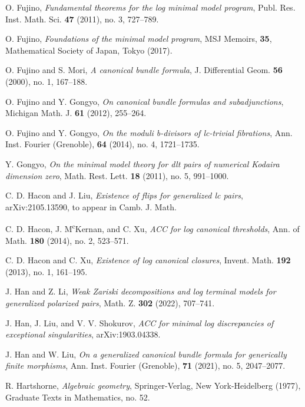 \documentclass[11pt]{amsart}
\numberwithin{equation}{section}
\theoremstyle{definition}
\theoremstyle{definition}
\theoremstyle{definition}
\begin{document}
\begin{thebibliography}{99}
 O. Fujino, \textit{Fundamental theorems for the log minimal model program}, Publ. Res. Inst. Math. Sci. \textbf{47} (2011), no. 3, 727--789.


 O. Fujino, \textit{Foundations of the minimal model program}, MSJ Memoirs, \textbf{35}, Mathematical Society of Japan, Tokyo (2017).

 O. Fujino and S. Mori, \textit{A canonical bundle formula}, J. Differential Geom. \textbf{56} (2000), no. 1, 167--188.

 O. Fujino and Y. Gongyo, \textit{On canonical bundle formulas and subadjunctions}, Michigan Math. J. \textbf{61} (2012), 255--264.

 O. Fujino and Y. Gongyo, \textit{On the moduli b-divisors of lc-trivial fibrations}, Ann. Inst. Fourier (Grenoble), \textbf{64} (2014), no. 4, 1721--1735.

 Y. Gongyo, \textit{On the minimal model theory for dlt pairs of numerical Kodaira dimension zero}, Math. Rest. Lett. \textbf{18} (2011), no. 5, 991--1000.

 C. D. Hacon and J. Liu, \textit{Existence of flips for generalized lc pairs}, arXiv:2105.13590, to appear in Camb. J. Math. 

 C. D. Hacon, J. M\textsuperscript{c}Kernan, and C. Xu, \textit{ACC for log canonical thresholds}, Ann. of Math. \textbf{180} (2014), no. 2, 523--571.

 C. D. Hacon and C. Xu, \textit{Existence of log canonical closures}, Invent. Math. \textbf{192} (2013), no. 1, 161--195.

 J. Han and Z. Li, \textit{Weak Zariski decompositions and log terminal models for generalized polarized pairs}, Math. Z. \textbf{302} (2022), 707--741.

 J. Han, J. Liu, and V. V. Shokurov, \textit{ACC for minimal log discrepancies of exceptional singularities}, arXiv:1903.04338.

 J. Han and W. Liu, \textit{On a generalized canonical bundle formula for generically finite morphisms},  Ann. Inst. Fourier (Grenoble), \textbf{71} (2021), no. 5, 2047--2077.


 R. Hartshorne, \textit{Algebraic geometry}, Springer-Verlag, New York-Heidelberg (1977), Graduate Texts in Mathematics, no. 52.



\end{thebibliography}
\end{document}
